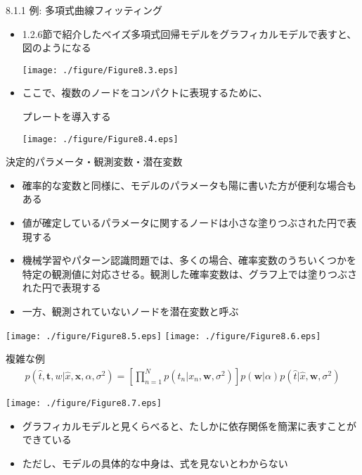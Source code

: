 \begin{frame}{8.1.1 例: 多項式曲線フィッティング}
 \begin{itemize}
  \item 1.2.6節で紹介したベイズ多項式回帰モデルをグラフィカルモデルで表すと、図のようになる
        \begin{center}
         \texttt{[image: ./figure/Figure8.3.eps]}
        \end{center}
  \item ここで、複数のノードをコンパクトに表現するために、

        \alert{プレート}を導入する
        \begin{center}
         \texttt{[image: ./figure/Figure8.4.eps]}
        \end{center}
 \end{itemize}
\end{frame}

\begin{frame}{決定的パラメータ・観測変数・潜在変数}
 \begin{itemize}
  \item 確率的な変数と同様に、モデルのパラメータも陽に書いた方が便利な場合もある
  \item 値が確定しているパラメータに関するノードは小さな塗りつぶされた円で表現する
  \item 機械学習やパターン認識問題では、多くの場合、確率変数のうちいくつかを特定の観測値に対応させる。観測した確率変数は、グラフ上では塗りつぶされた円で表現する
  \item 一方、観測されていないノードを潜在変数と呼ぶ
 \end{itemize}
 \begin{center}
  \texttt{[image: ./figure/Figure8.5.eps]}
  \texttt{[image: ./figure/Figure8.6.eps]}
 \end{center}
\end{frame}

\begin{frame}{複雑な例}
 \begin{eqnarray*}
  p(\hat{t}, \bm{t}, w| \hat{x}, \bm{x}, \alpha , \sigma^2) = \left[\prod_{n=1}^{N}p(t_n|x_n, \bm{w}, \sigma^2)\right]p(\bm{w}|\alpha)p(\hat{t}|\hat{x}, \bm{w}, \sigma^2)
 \end{eqnarray*}
 \begin{center}
  \texttt{[image: ./figure/Figure8.7.eps]}
 \end{center}
 \begin{itemize}
  \item グラフィカルモデルと見くらべると、たしかに依存関係を簡潔に表すことができている
  \item ただし、モデルの具体的な中身は、式を見ないとわからない
 \end{itemize}
\end{frame}
